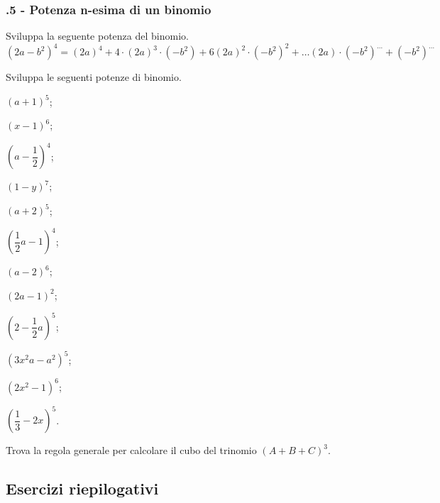  \subsubsection*{\thechapter.5 - Potenza n-esima di un binomio}

\begin{esercizio}
 \label{ese:12.28}
 Sviluppa la seguente potenza del binomio.
 \[\left(2a-b^{2}\right)^{4}=\left(2a\right)^{4}+4\cdot
\left(2a\right)^{3}\cdot \left(-b^{2}\right)+6\left(2a\right)^{2}\cdot
\left(-b^{2}\right)^{2}+\ldots \left(2a\right)\cdot
\left(-b^{2}\right)^{\ldots }+\left(-b^{2}\right)^{\ldots }\]
\end{esercizio}

\begin{esercizio}
 \label{ese:12.29}
 Sviluppa le seguenti potenze di binomio.
 \begin{multicols}{4}
 \begin{enumeratea}
 \spazielenx
\item $\left(a+1\right)^{5}$;
\item $\left(x-1\right)^{6}$;
\item $\left(a-\dfrac{1}{2}\right)^{4}$;
\item $\left(1-y\right)^{7}$;
\item $\left(a+2\right)^{5}$;
\item $\left(\dfrac{1}{2}a-1\right)^{4}$;
\item $\left(a-2\right)^{6}$;
\item $\left(2a-1\right)^{2}$;
\item $\left(2-\dfrac{1}{2}a\right)^{5}$;
\item $\left(3x^{2}a-a^{2}\right)^{5}$;
\item $\left(2x^{2}-1\right)^{6}$;
\item $\left(\dfrac{1}{3}-2x\right)^{5}$.
\end{enumeratea}
 \end{multicols}
\end{esercizio}

\begin{esercizio}
 \label{ese:12.30}
 Trova la regola generale per calcolare il cubo del trinomio
$(A+B+C)^{3}$.
\end{esercizio}

\subsection{Esercizi riepilogativi}

